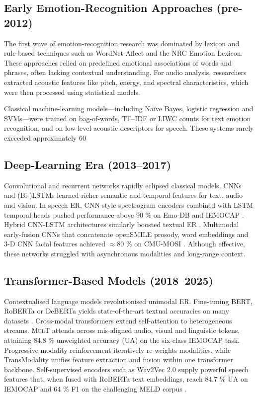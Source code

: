 \documentclass[12pt]{article}
\begin{document}
\subsection{Early Emotion-Recognition Approaches (pre-2012)}
The first wave of emotion-recognition research was dominated by lexicon and rule-based techniques such as WordNet-Affect and the NRC Emotion Lexicon. These approaches relied on predefined emotional associations of words and phrases, often lacking contextual understanding. For audio analysis, researchers extracted acoustic features like pitch, energy, and spectral characteristics, which were then processed using statistical models.

Classical machine-learning models—including Naïve Bayes, logistic regression and SVMs—were trained on bag-of-words, TF–IDF or LIWC counts for text emotion recognition, and on low-level acoustic descriptors for speech. These systems rarely exceeded approximately 60%

\subsection{Deep-Learning Era (2013–2017)}
Convolutional and recurrent networks rapidly eclipsed classical models.
CNNs and \mbox{(Bi-)LSTMs} learned richer semantic and temporal features
for text, audio and vision.  In speech ER, CNN-style spectrogram
encoders combined with LSTM temporal heads pushed performance above
90 \% on Emo-DB and IEMOCAP \cite{mao2014learning}.  Hybrid CNN-LSTM
architectures similarly boosted textual ER
\cite{abdul2017emonet}.  Multimodal early-fusion CNNs that concatenate
openSMILE prosody, word embeddings and 3-D CNN facial features achieved
$\approx$80 \% on CMU-MOSI \cite{poria2018multimodal}.  Although
effective, these networks struggled with asynchronous modalities and
long-range context.

\subsection{Transformer-Based Models (2018–2025)}
Contextualised language models revolutionised unimodal ER.  Fine-tuning
BERT, RoBERTa or DeBERTa yields state-of-the-art textual accuracies on
many datasets \cite{liu2019roberta}.  Cross-modal transformers extend
self-attention to heterogeneous streams.  \textsc{MulT}
\cite{tsai2019mult} attends across mis-aligned audio, visual and
linguistic tokens, attaining 84.8 \% unweighted accuracy (UA) on the
six-class IEMOCAP task.  Progressive-modality reinforcement
\cite{lv2021progressive} iteratively re-weights modalities, while
TransModality \cite{wang2020context} unifies feature extraction and
fusion within one transformer backbone.  Self-supervised encoders such
as Wav2Vec 2.0 supply powerful speech features that, when fused with
RoBERTa text embeddings, reach 84.7 \% UA on IEMOCAP and 64 \% F1 on the
challenging MELD corpus \cite{siriwardhana2020joint}.
\end{document}
